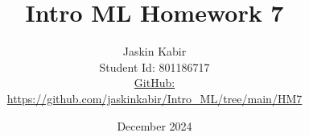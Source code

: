 \title{\Huge Intro ML Homework 7}

\author{ \huge
Jaskin Kabir \\
\Large Student Id: 801186717 \\
\Large \href{https://github.com/jaskinkabir/Intro_ML/tree/main/HM7}{GitHub:}\\\url{https://github.com/jaskinkabir/Intro_ML/tree/main/HM7}
}

\date{December 2024}

\begin{titlingpage}
\maketitle
\end{titlingpage}